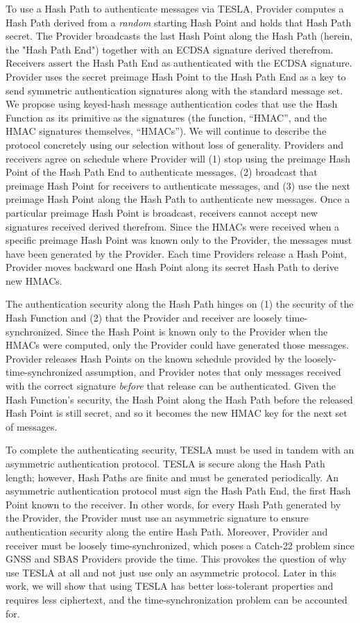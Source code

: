 \documentclass[letterpaper,times]{IONconf/IONconf}
\begin{document}
To use a Hash Path to authenticate messages via TESLA, Provider computes a Hash Path derived from a {\em random} starting Hash Point and holds that Hash Path secret.
The Provider broadcasts the last Hash Point along the Hash Path (herein, the "Hash Path End") together with an ECDSA signature derived therefrom.
Receivers assert the Hash Path End as authenticated with the ECDSA signature.
Provider uses the secret preimage Hash Point to the Hash Path End as a key to send symmetric authentication signatures along with the standard message set.
We propose using keyed-hash message authentication codes that use the Hash Function as its primitive as the signatures (the function, ``HMAC'', and the HMAC signatures themselves, ``HMACs''). 
We will continue to describe the protocol concretely using our selection without loss of generality.
Providers and receivers agree on schedule where Provider will (1) stop using the preimage Hash Point of the Hash Path End to authenticate messages, (2) broadcast that preimage Hash Point for receivers to authenticate messages, and (3) use the next preimage Hash Point along the Hash Path to authenticate new messages.
Once a particular preimage Hash Point is broadcast, receivers cannot accept new signatures received derived therefrom.
Since the HMACs were received when a specific preimage Hash Point was known only to the Provider, the messages must have been generated by the Provider.
Each time Providers release a Hash Point, Provider moves backward one Hash Point along its secret Hash Path to derive new HMACs.

The authentication security along the Hash Path hinges on (1) the security of the Hash Function and (2) that the Provider and receiver are loosely time-synchronized.
Since the Hash Point is known only to the Provider when the HMACs were computed, only the Provider could have generated those messages.
Provider releases Hash Points on the known schedule provided by the loosely-time-synchronized assumption, and Provider notes that only messages received with the correct signature {\em before} that release can be authenticated.
Given the Hash Function's security, the Hash Point along the Hash Path before the released Hash Point is still secret, and so it becomes the new HMAC key for the next set of messages.

To complete the authenticating security, TESLA must be used in tandem with an asymmetric authentication protocol.
TESLA is secure along the Hash Path length; however, Hash Paths are finite and must be generated periodically.
An asymmetric authentication protocol must sign the Hash Path End, the first Hash Point known to the receiver.
In other words, for every Hash Path generated by the Provider, the Provider must use an asymmetric signature to ensure authentication security along the entire Hash Path.
Moreover, Provider and receiver must be loosely time-synchronized, which poses a Catch-22 problem since GNSS and SBAS Providers provide the time.
This provokes the question of why use TESLA at all and not just use only an asymmetric protocol.
Later in this work, we will show that using TESLA has better loss-tolerant properties and requires less ciphertext, and the time-synchronization problem can be accounted for.
\end{document}
